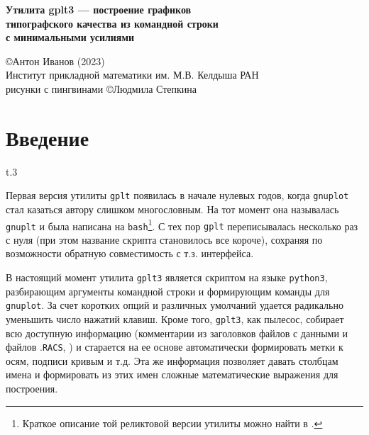 \documentclass[12pt]{article}
\def\gplt{{\tt gplt}}
\def\gnuplot{{\tt gnuplot}}
\def\python{{\tt python3}}
\def\RACS{{\tt RACS}}
\begin{document}
\begin{center}
 { \Large\bf
Утилита gplt3 --- построение графиков\\ типографского качества из командной строки\\ с минимальными усилиями\\[5mm]
}

\large
\copyright Антон Иванов (2023)\\[2mm]

\normalsize
Институт прикладной математики им. М.В. Келдыша РАН\\[2mm]

\small рисунки с пингвинами \copyright Людмила Степкина 
\end{center}

\vfill

\tableofcontents

\newpage
\section{Введение}
\begin{wrapfigure}[5]{t}{.3\textwidth}
  \vphantom{.}
  \vspace{-1.5cm}

\end{wrapfigure}

Первая версия утилиты \gplt{} появилась в начале нулевых годов, когда \gnuplot{} стал казаться автору слишком многословным.
На тот момент она называлась \verb'gnuplt' и была написана на \verb'bash'\footnote{Краткое описание той реликтовой версии утилиты можно найти в \cite{aiv:racs2007}.}.
С тех пор \gplt{} переписывалась несколько раз с нуля (при этом название скрипта становилось все короче),
сохраняя по возможности обратную совместимость с т.з. интерфейса.  

\def\gplt{{\tt gplt3}}

В настоящий момент утилита \gplt{} является скриптом на языке \python, разбирающим аргументы командной строки и формирующим команды для \gnuplot.
За счет коротких опций и различных умолчаний удается радикально уменьшить число нажатий клавиш. Кроме того, \gplt{}, как пылесос, собирает всю доступную информацию
(комментарии из заголовков файлов с данными и файлов .\RACS, \cite{aiwlib:SR:PP2018})
и старается на ее основе автоматически формировать метки к осям, подписи кривым и т.д.
Эта же информация позволяет давать столбцам имена и формировать из этих имен сложные математические выражения для построения.
\end{document}
